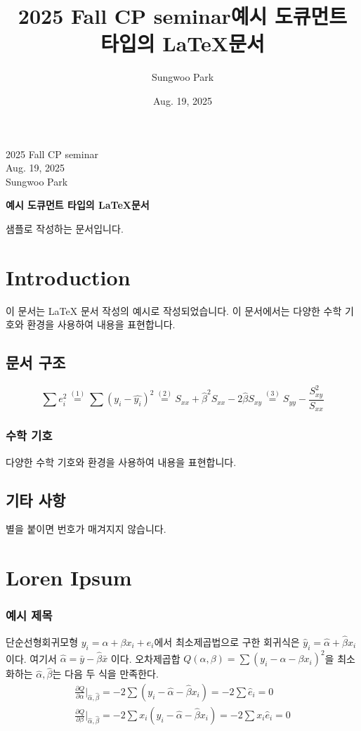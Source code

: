 \documentclass[11pt, a4paper]{article}
\newcommand{\doctitle}{예시 도큐먼트 타입의 \LaTeX 문서}
\newcommand{\lecname}{2025 Fall CP seminar}
\newcommand{\name}{Sungwoo Park}
\newcommand{\todaydate}{Aug. 19, 2025}
\begin{document}
\title{\lecname \doctitle}
\author{\name}
\date{\todaydate}

\begin{flushright}
\lecname \\
\todaydate \\
\name \\
\end{flushright}

\begin{center}
\Large
\bfseries
\doctitle
\end{center}

\thispagestyle{plain}

샘플로 작성하는 문서입니다.

\section{Introduction}
이 문서는 \LaTeX{} 문서 작성의 예시로 작성되었습니다. 이 문서에서는 다양한 수학 기호와 환경을 사용하여 내용을 표현합니다.

\subsection{문서 구조}
\[\sum e_i^2 \overset{(1)}{=}\sum(y_i - \hat{y_i})^2 \overset{(2)}{=} S_{xx}+\hat{\beta}^2S_{xx}-2\hat{\beta}S_{xy}\overset{(3)}{=}S_{yy}-\frac{S_{xy}^2}{S_{xx}}\]

\subsubsection{수학 기호}
다양한 수학 기호와 환경을 사용하여 내용을 표현합니다.

\subsection*{기타 사항}
별을 붙이면 번호가 매겨지지 않습니다.

\section{Loren Ipsum}
\subsubsection{예시 제목}
단순선형회귀모형 \(y_i = \alpha + \beta x_i + e_i\)에서 최소제곱법으로 구한 회귀식은 \(\hat{y}_i = \hat{\alpha} + \hat{\beta} x_i\) 이다. 여기서 \(\hat{\alpha} = \bar{y} - \hat{\beta}\bar{x}\) 이다. 오차제곱합 \(Q(\alpha, \beta) = \sum(y_i - \alpha - \beta x_i)^2\)을 최소화하는 \(\hat{\alpha}, \hat{\beta}\)는 다음 두 식을 만족한다.
\begin{align*}
    \frac{\partial Q}{\partial \alpha} \bigg|_{\hat{\alpha}, \hat{\beta}} = -2 \sum(y_i - \hat{\alpha} - \hat{\beta} x_i) = -2 \sum \hat{e}_i = 0 \\
    \frac{\partial Q}{\partial \beta} \bigg|_{\hat{\alpha}, \hat{\beta}} = -2 \sum x_i(y_i - \hat{\alpha} - \hat{\beta} x_i) = -2 \sum x_i \hat{e}_i = 0
\end{align*}
\end{document}
